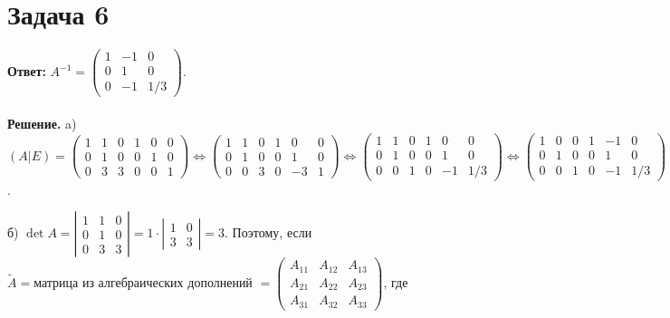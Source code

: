 \documentclass{article}
\begin{document}
\section*{Задача 6}
{\bf Ответ:} $A^{-1}=\left(\begin{array}{ccc}1 & -1 & 0\\ 0 & 1 & 0\\ 0 & -1 & 1/3\end{array}\right)$.
\\
\\
{\bf Решение.} a) $(A|E)=\left(\begin{array}{ccc|ccc}1 & 1 & 0 & 1 & 0  & 0\\ 0 & 1 & 0 & 0 & 1 & 0\\0 & 3 & 3 & 0 & 0 & 1\end{array}\right)\Leftrightarrow\left(\begin{array}{ccc|ccc}1 & 1 & 0 & 1 & 0 & 0\\0 & 1 & 0 & 0 & 1 & 0\\0 & 0 & 3 & 0 & -3 & 1\end{array}\right)\Leftrightarrow\left(\begin{array}{ccc|ccc}1 & 1 & 0 & 1 & 0 & 0\\0 & 1 & 0 & 0 & 1 & 0\\0 & 0 & 1 & 0 & -1 & 1/3\end{array}\right)\Leftrightarrow\left(\begin{array}{ccc|ccc}1 & 0 & 0 & 1 & -1  & 0\\0 & 1 & 0 & 0 & 1 & 0\\0 & 0 & 1 & 0 & -1 & 1/3\end{array}\right)=(E|A^{-1}) \Rightarrow A^{-1}=\left(\begin{array}{ccc}1 & -1 & 0\\ 0 & 1 & 0\\ 0 & -1 & 1/3\end{array}\right)$.
\par
б) $\det A = \left|\begin{array}{rrr}1 & 1 & 0\\0 & 1 & 0\\0 & 3 & 3\end{array}\right|=1\cdot\left|\begin{array}{rr}1 & 0\\3 & 3\end{array}\right|=3$. Поэтому, если $\tilde A = \textrm{матрица из алгебраических дополнений } =\left(\begin{array}{ccc}A_{11} & A_{12} & A_{13}\\A_{21} & A_{22} & A_{23}\\A_{31} & A_{32} & A_{33}\end{array}\right)$, где
\end{document}
